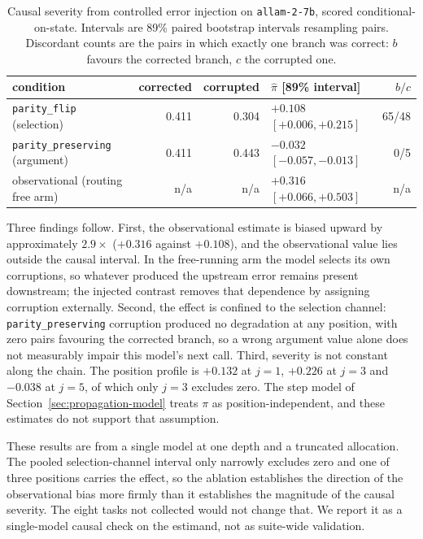 \documentclass{article}
\begin{document}
\begin{table}[h]
\centering
\caption{Causal severity from controlled error injection on \texttt{allam-2-7b}, scored
conditional-on-state. Intervals are 89\% paired bootstrap intervals resampling pairs.
Discordant counts are the pairs in which exactly one branch was correct: $b$ favours the
corrected branch, $c$ the corrupted one.}
\label{tab:injection}
\footnotesize
\begin{tabular}{@{}lrrlr@{}}
\toprule
condition & corrected & corrupted & $\hat\pi$ [89\% interval] & $b/c$ \\
\midrule
\texttt{parity\_flip} (selection) & 0.411 & 0.304 & \textbf{$+0.108$} $[+0.006,+0.215]$ & 65/48 \\
\texttt{parity\_preserving} (argument) & 0.411 & 0.443 & $-0.032$ $[-0.057,-0.013]$ & 0/5 \\
\midrule
observational (routing free arm) & n/a & n/a & $+0.316$ $[+0.066,+0.503]$ & n/a \\
\bottomrule
\end{tabular}
\end{table}

Three findings follow. First, the observational estimate is biased upward by
approximately $2.9\times$ ($+0.316$ against $+0.108$), and the observational value lies
outside the causal interval. In the free-running arm the model selects its own
corruptions, so whatever produced the upstream error remains present downstream; the
injected contrast removes that dependence by assigning corruption externally. Second, the
effect is confined to the selection channel: \texttt{parity\_preserving} corruption
produced no degradation at any position, with zero pairs favouring the corrected branch,
so a wrong argument value alone does not measurably impair this model's next call. Third,
severity is not constant along the chain. The position profile is $+0.132$ at $j=1$,
$+0.226$ at $j=3$ and $-0.038$ at $j=5$, of which only $j=3$ excludes zero. The step
model of Section~\ref{sec:propagation-model} treats $\pi$ as position-independent, and
these estimates do not support that assumption.

These results are from a single model at one depth and a truncated allocation. The pooled
selection-channel interval only narrowly excludes zero and one of three positions carries
the effect, so the ablation establishes the direction of the observational bias more
firmly than it establishes the magnitude of the causal severity. The eight tasks not
collected would not change that. We report it as a single-model causal check on the
estimand, not as suite-wide validation.
\end{document}
